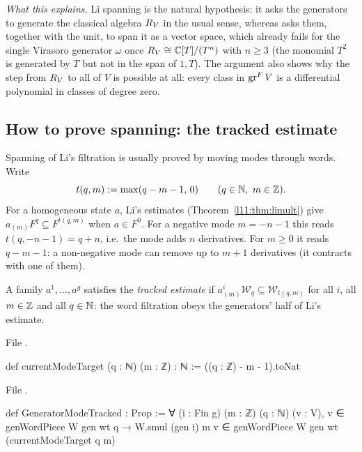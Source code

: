 \emph{What this explains.} Li spanning is the natural hypothesis: it asks the generators to generate the classical
algebra $R_V$ in the usual sense, whereas  asks them, together with the unit, to span it as a vector space, which
already fails for the single Virasoro generator $\omega$ once $R_V\cong{\mathbb{C}}[T]/(T^n)$ with $n\ge3$ (the monomial
$T^2$ is generated by $T$ but not in the span of $1,T$). The argument also shows why the step from $R_V$
to all of $V$ is possible at all: every class in $\operatorname{gr}^FV$ is a differential polynomial in classes of degree zero.

\subsection{How to prove spanning: the tracked estimate}\label{l11:sec:genwords-spanning}

Spanning of Li's filtration is usually proved by moving modes through words. Write
\begin{equation*}
  t(q,m) := \max(q-m-1,\,0)\qquad(q\in{\mathbb{N}},\ m\in{\mathbb{Z}}).
\end{equation*}
For a homogeneous state $a$, Li's estimates (Theorem~\ref{l11:thm:limult}) give $a_{(m)}F^q\subseteq F^{t(q,m)}$ when $a\in F^0$.
For a negative mode $m=-n-1$ this reads $t(q,-n-1) = q+n$, i.e.\ the mode adds $n$ derivatives. For $m\ge0$ it reads
$q-m-1$: a non-negative mode can remove up to $m+1$ derivatives (it contracts with one of them).

\begin{definition}\label{l11:def:tracked}
A family $a^1,\dots,a^g$ satisfies the \emph{tracked estimate} if $a^i_{(m)}\mathcal W_q\subseteq \mathcal W_{t(q,m)}$ for all
$i$, all $m\in{\mathbb{Z}}$ and all $q\in{\mathbb{N}}$: the word filtration obeys the generators' half of Li's estimate.
\end{definition}
\noindent File .
\begin{leancode}
def currentModeTarget (q : ℕ) (m : ℤ) : ℕ := ((q : ℤ) - m - 1).toNat
\end{leancode}
\noindent File .
\begin{leancode}
def GeneratorModeTracked : Prop :=
  ∀ (i : Fin g) (m : ℤ) (q : ℕ) (v : V), v ∈ genWordPiece W gen wt q →
    W.smul (gen i) m v ∈ genWordPiece W gen wt (currentModeTarget q m)
\end{leancode}

